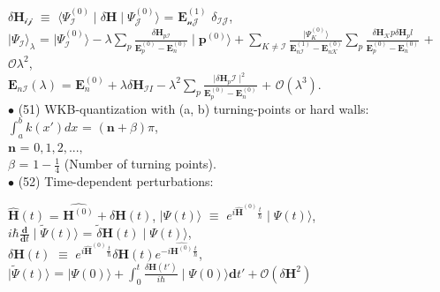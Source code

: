 \documentclass[a4paper, 10pt, onepage]{elegantbook}
\begin{document}
{$\delta \mathbf H_{\mathcal {ij}}$ $\equiv$ $\langle \Psi^{(0)}_\mathcal I \mid \delta \mathbf H \mid \Psi^{(0)}_\mathcal J \rangle$ = $\mathbf E^{(1)}_\mathcal {nJ}$ $\delta_\mathcal {IJ}$,  \\

$\mid \Psi_\mathcal I \rangle_\lambda$ = $\mid \Psi^{(0)}_{\mathcal I} \rangle - \lambda \sum_p \frac{\delta \mathbf H_{p \mathcal I}} {\mathbf E^{(0)}_p - \mathbf E^{(0)}_n} \mid \mathbf p^{(0)} \rangle + \sum_{K \neq \mathcal I} \frac{ \mid \Psi^{(0)}_K \rangle} {\mathbf E^{(1)}_{n \mathcal I} - \mathbf E^{(0)}_{n \mathcal K}} \sum_p \frac{ \delta \mathbf H_\mathcal K p \delta \mathbf H_pl} {\mathbf E^(0)_p - \mathbf E^(0)_n}$ + $\mathcal O \lambda^2$,  \\

$\mathbf E_{n \mathcal I} (\lambda)$ = $\mathbf E^{(0)}_n + \lambda \delta \mathbf H_{\mathcal II} -\lambda^2 \sum_p \frac{ \mid \delta \mathbf H_p \mathcal I \mid^2}{\mathbf E^{(0)}_p - \mathbf E^{(0)}_n}$ + $\mathcal O (\lambda^3)$. \\

$\bullet$ (51) WKB-quantization with (a, b) turning-points or hard walls:  \\

$\int_a^b k(x') dx$ = $(\mathbf n + \beta) \pi$,  \\

$\mathbf n$ = $0,1,2,...,$  \\

$\beta$ = $1 - \frac{1}{4}$ (Number of turning points). \\

$\bullet$ (52) Time-dependent perturbations:

$\hat{\mathbf H} (t)$ = $\hat{\mathbf H^{(0)}} + \delta \mathbf H (t)$, $ | \Psi (t) \rangle$ $\equiv$ $e^{i \hat{\mathbf H}^{(0)} {\frac{t}{\hbar}}} \mid \Psi (t) \rangle$,  \\

$i \hbar \frac{ \mathbf d}{\mathbf dt} \mid {\tilde \Psi} (t) \rangle$ = $ {\tilde \delta} \mathbf H (t) \mid \Psi (t) \rangle$,  \\

$\delta \mathbf H (t)$ $\equiv$ $e^{i \hat{\mathbf H}^{(0)}{\frac{t}{\hbar}}} \delta \mathbf H (t) e^{- i \hat{\mathbf H^{(0)}} {\frac{t}{\hbar}}}$,  \\

$\mid \tilde \Psi (t) \rangle$ = $ \mid \Psi(0) \rangle + \int_0^t \frac{ \delta \mathbf H(t')} {i \hbar} \mid \Psi(0) \rangle \mathbf dt' + \mathcal O( \delta \mathbf H^2)$  \\

}
\end{document}
